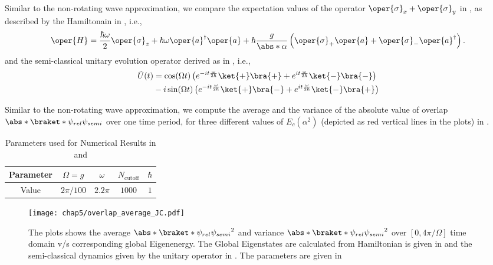 Similar to the non-rotating wave approximation, we compare the expectation values of the operator
\(\oper{\sigma}_x + \oper{\sigma}_y\) in , as described by the Hamiltonain in , i.e., 
\begin{eqnarray}
\label{eq:chap5_JC_rotwave_hamiltonian}
    \oper{H} = \frac{\hbar \omega}{2} \oper{\sigma}_z + \hbar \omega\oper{a}^\dagger \oper{a}
    + \hbar \frac{g}{\abs*{\alpha}} \left(\oper{\sigma}_+ \oper{a} + \oper{\sigma}_- \oper{a}^\dagger\right).
\end{eqnarray}
and the semi-classical unitary evolution operator derived as in , i.e.,
\begin{eqnarray}
\label{eq:chap5_JC_rotwave_unitary_semi}
    \tilde{U}(t) 
    &= \cos(\Omega t) \left(e^{-i t \frac{\omega}{2\hbar}}\ket{+}\bra{+} + 
    e^{i t \frac{\omega}{2\hbar}}\ket{-}\bra{-} \right)  \nonumber \\
    &- i \sin(\Omega t)
     \left( e^{-i t \frac{\omega}{2\hbar}}\ket{+}\bra{-}
    + e^{i t \frac{\omega}{2\hbar}}\ket{-}\bra{+}\right) 
\end{eqnarray}




Similar to the non-rotating wave approximation, we compute the average and the 
variance of the absolute value of overlap \(\abs*{\braket*{\psi_{rel}}{\psi_{semi}}}\) over one time period, 
for three different values of \(E_c(\alpha^2)\) (depicted as red vertical lines in the plots)
in .

\begin{table}[!ht]
    \centering
    \label{tab:numerical_values_JC}
        \begin{tabular}{|c|c|c|c|c|}
            \hline
            Parameter & $\Omega = g$ & $\omega$ & $N_{\text{cutoff}}$ & $\hbar$ \\
            \hline
            Value & $2\pi/100$ & $2.2\pi$ & $1000$ & $1$ \\
            \hline
        \end{tabular}
    \caption{Parameters used for Numerical Results in  and 
    }
\end{table}

\begin{figure}[!h]
    \centering
    \texttt{[image: chap5/overlap\_average\_JC.pdf]}
    \caption{The plots shows the average $\abs*{\braket*{\psi_{rel}}{\psi_{semi}}}^2$ and 
     variance $\abs*{\braket*{\psi_{rel}}{\psi_{semi}}}^2$ over \([0, 4\pi/\Omega]\) time domain 
     v/s corresponding global Eigenenergy.
     The Global Eigenstates are calculated from 
    Hamiltonian is given in  and the semi-classical dynamics given by the unitary operator in . The parameters 
    are given in  }
     \label{fig:chap5_JCM_overlap_avg}
\end{figure}


